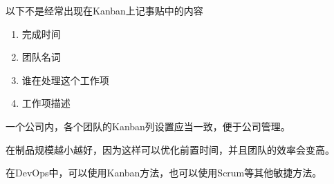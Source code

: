 \begin{problem}
	以下不是经常出现在Kanban上记事贴中的内容
    \vspace{-0.8em}
    \begin{multicols}{2}
        \begin{enumerate}[label=\Alph*.]
            \item 完成时间
            \item 团队名词
            \item 谁在处理这个工作项
            \item 工作项描述
        \end{enumerate}
    \end{multicols}
    \vspace{-1em}
\end{problem}




\begin{problem}
	一个公司内，各个团队的Kanban列设置应当一致，便于公司管理。
\end{problem}




\begin{problem}
	在制品规模越小越好，因为这样可以优化前置时间，并且团队的效率会变高。
\end{problem}



\begin{problem}
	在DevOps中，可以使用Kanban方法，也可以使用Scrum等其他敏捷方法。
\end{problem}

